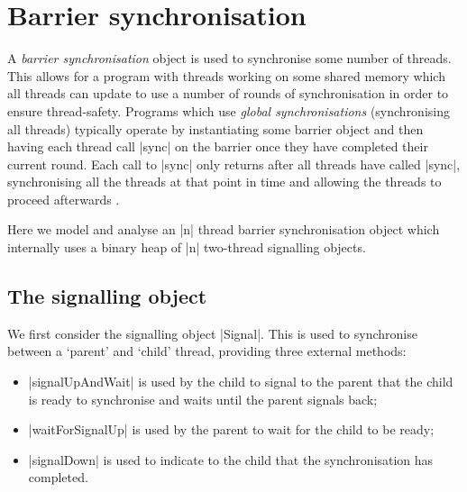 \newpage
\section{Barrier synchronisation}
\inlineScala

A \emph{barrier synchronisation} object is used to synchronise some number of threads. This allows for a program with threads working on some shared memory which all threads can update to use a number of rounds of synchronisation in order to ensure thread-safety. Programs which use \emph{global synchronisations} (synchronising all threads) typically operate by instantiating some barrier object and then having each thread call |sync| on the barrier once they have completed their current round. Each call to |sync| only returns after all threads have called |sync|, synchronising all the threads at that point in time and allowing the threads to proceed afterwards \cite{CP}.

Here we model and analyse an |n| thread barrier synchronisation object which internally uses a binary heap of |n| two-thread signalling objects.

\subsection{The signalling object}

We first consider the signalling object |Signal|. This is used to synchronise between a `parent' and `child' thread, providing three external methods:

\begin{itemize}
  \item |signalUpAndWait| is used by the child to signal to the parent that the child is ready to synchronise and waits until the parent signals back;
  \item |waitForSignalUp| is used by the parent to wait for the child to be ready;
  \item |signalDown| is used to indicate to the child that the synchronisation has completed.
\end{itemize}

